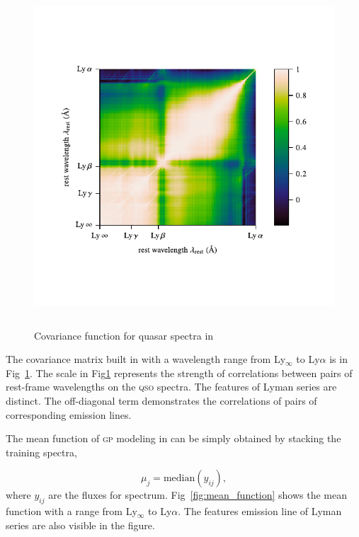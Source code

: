 \documentclass{ar-1col}
\begin{document}
\begin{figure}
    \includegraphics[width=5in, height=5in]{images/covariance.pdf}
    \caption{Covariance function for quasar spectra in \citet{Garnett17}}
    \label{fig:covariance}
\end{figure}

The covariance matrix built in \citet{Garnett17} with a wavelength range from Ly$_\infty$ to Ly$\alpha$ is in Fig~\ref{fig:covariance}. 
The scale in Fig\ref{fig:covariance} represents the strength of correlations between pairs of rest-frame wavelengths on the \textsc{qso} spectra.
The features of Lyman series are distinct.
The off-diagonal term demonstrates the correlations of pairs of corresponding emission lines.

The mean function of \textsc{gp} modeling in \citet{Garnett17} can be simply obtained by stacking the training spectra, 

\begin{equation}
    \mu_j = \mathrm{median } (y_{ij}),
\end{equation}
where $y_{ij}$ are the fluxes for spectrum. Fig~\ref{fig:mean_function} shows the mean function with a range from Ly$_\infty$ to Ly$\alpha$. 
The features emission line of Lyman series are also visible in the figure.
\end{document}
